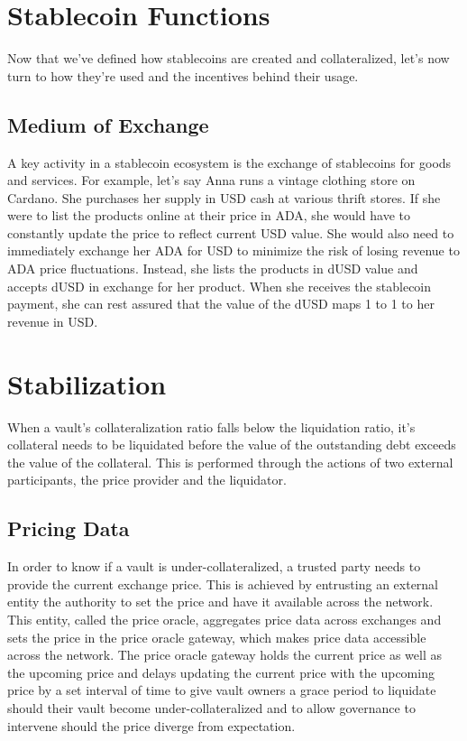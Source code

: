 \documentclass[12pt]{article}
\begin{document}
\section{Stablecoin Functions}

Now that we've defined how stablecoins are created and collateralized, let's now turn to how they're used and the incentives behind their usage.

\subsection{Medium of Exchange}

A key activity in a stablecoin ecosystem is the exchange of stablecoins for goods and services. For example, let's say Anna runs a vintage clothing store on Cardano. She purchases her supply in USD cash at various thrift stores. If she were to list the products online at their price in ADA, she would have to constantly update the price to reflect current USD value. She would also need to immediately exchange her ADA for USD to minimize the risk of losing revenue to ADA price fluctuations. Instead, she lists the products in dUSD value and accepts dUSD in exchange for her product. When she receives the stablecoin payment, she can rest assured that the value of the dUSD maps 1 to 1 to her revenue in USD.

\section{Stabilization}
When a vault's collateralization ratio falls below the liquidation ratio, it's collateral needs to be liquidated before the value of the outstanding debt exceeds the value of the collateral. This is performed through the actions of two external participants, the price provider and the liquidator.

\subsection{Pricing Data}
In order to know if a vault is under-collateralized, a trusted party needs to provide the current exchange price. This is achieved by entrusting an external entity the authority to set the price and have it available across the network. This entity, called the price oracle, aggregates price data across exchanges and sets the price in the price oracle gateway, which makes price data accessible across the network. The price oracle gateway holds the current price as well as the upcoming price and delays updating the current price with the upcoming price by a set interval of time to give vault owners a grace period to liquidate should their vault become under-collateralized and to allow governance to intervene should the price diverge from expectation.
\end{document}
